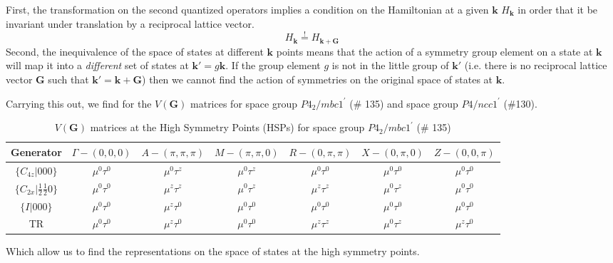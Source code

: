 \documentclass[prb,aps,amssymb,twocolumn,notitlepage]{revtex4-2}
\begin{document}
 First, the transformation on the second quantized operators implies a condition on the Hamiltonian at a given $\mathbf{k}$ $H_{\mathbf{k}}$ in order that it be invariant under translation by a reciprocal lattice vector.
\begin{equation}
    \label{eq:periodicitycondition}
    H_{\mathbf{k}}\overset{!}{=}H_{\mathbf{k}+\mathbf{G}}
\end{equation}
Second, the inequivalence of the space of states at different $\mathbf{k}$ points means that the action of a symmetry group element on a state at $\mathbf{k}$ will map it into a \textit{different} set of states at $\mathbf{k}'=g\mathbf{k}$. 
If the group element $g$ is not in the little group of $\mathbf{k}'$ (i.e. there is no reciprocal lattice vector $\mathbf{G}$ such that $\mathbf{k}'=\mathbf{k}+\mathbf{G}$) then we cannot find the action of symmetries on the original space of states at $\mathbf{k}$. 



Carrying this out, we find  for the $V(\mathbf{G})$ matrices for space group $P4_2/mbc1^\prime$ (\# 135) and space group $P4/ncc1^\prime$ (\#130).

\begin{table}[ht]
\caption{$V(\mathbf{G})$ matrices at the High Symmetry Points (HSPs) for space group $P4_2/mbc1^\prime$ (\# 135)} %
\centering %
\begin{tabular}{c c c c c c c} %
\hline\hline %
Generator & $\Gamma - (0,0,0)$ & $A - (\pi,\pi,\pi)$ & $M - (\pi,\pi,0)$ & $R - (0,\pi,\pi)$ & $X -(0,\pi,0)$ & $Z - (0,0,\pi)$\\[0.5ex] 
\hline %
$\{C_{4z}|000\}$ &$\mu^0\tau^0$ & $\mu^0\tau^z$ &$\mu^0\tau^z$ &$\mu^0\tau^0$ & $\mu^0\tau^0$ & $\mu^0\tau^0$\\
$\{C_{2x}|\tfrac{1}{2}\tfrac{1}{2}0\}$ & $\mu^0\tau^0$ & $\mu^z\tau^z$ & $\mu^0\tau^z$ & $\mu^z\tau^z$ & $\mu^0\tau^z$ & $\mu^0\tau^0$ \\
$\{I|000\}$ & $\mu^0\tau^0$ & $\mu^z\tau^0$ & $\mu^0\tau^0$ & $\mu^0\tau^0$ & $\mu^0\tau^0$ & $\mu^0\tau^0$ \\
TR & $\mu^0\tau^0$ & $\mu^z\tau^0$ & $\mu^0\tau^0$ & $\mu^z\tau^z$ & $\mu^0\tau^z$ & $\mu^z\tau^0$ \\ [1ex] %
\hline %
\end{tabular}
\label{table:135V(G)matrices} %
\end{table}
Which allow us to find the representations on the space of states at the high symmetry points.
\end{document}
